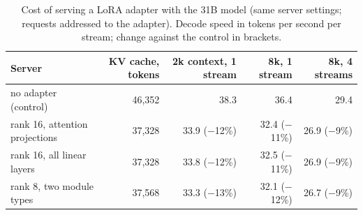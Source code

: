 \begin{table}[t]
\centering
\small
\caption{Cost of serving a LoRA adapter with the 31B model (same server settings; requests addressed to the adapter). Decode speed in tokens per second per stream; change against the control in brackets.}
\label{tab:adapter}
\begin{tabular}{lrrrr}
\toprule
Server & KV cache, tokens & 2k context, 1 stream & 8k, 1 stream & 8k, 4 streams \\
\midrule
no adapter (control) & 46{,}352 & 38.3 & 36.4 & 29.4 \\
rank 16, attention projections & 37{,}328 & 33.9 (\ensuremath{-}12\%) & 32.4 (\ensuremath{-}11\%) & 26.9 (\ensuremath{-}9\%) \\
rank 16, all linear layers & 37{,}328 & 33.8 (\ensuremath{-}12\%) & 32.5 (\ensuremath{-}11\%) & 26.9 (\ensuremath{-}9\%) \\
rank 8, two module types & 37{,}568 & 33.3 (\ensuremath{-}13\%) & 32.1 (\ensuremath{-}12\%) & 26.7 (\ensuremath{-}9\%) \\
\bottomrule
\end{tabular}
\end{table}
